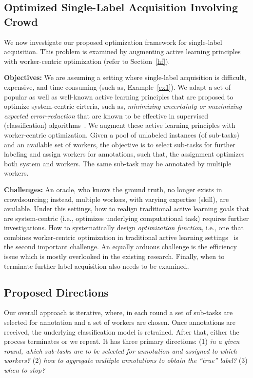 \vspace{-0.2in}
\subsection{Optimized Single-Label Acquisition Involving Crowd}\label{label}
\vspace{-0.1in}
We now investigate our proposed optimization framework for single-label acquisition. This problem is examined by augmenting active learning principles with worker-centric optimization (refer to Section~\ref{hf}).

{\bf Objectives:} We are assuming a setting where single-label acquisition is difficult, expensive, and time consuming (such as, Example~\ref{ex1}). We adapt a set of popular as well as well-known active learning principles\cite{al1,qbc1,qbc2,error-reduction} that are proposed to optimize system-centric cirteria, such as, {\em minimizing uncertainty or maximizing expected error-reduction} that are known to be effective in supervised (classification) algorithms~\cite{al-svm,al-svm2,al-dtree,korner2006multi}. We augment these active learning principles with worker-centric optimization. Given a pool of unlabeled instances  (of sub-tasks) and an available set of workers, the objective is to select sub-tasks for further labeling and assign workers for annotations, such that, the assignment optimizes both system and workers. The same sub-task may be annotated  by multiple workers.

{\bf Challenges:} An oracle, who knows the ground truth, no longer exists in crowdsourcing; instead, multiple workers, with varying expertise (skill), are available. Under this settings, how to realign traditional active learning goals that are system-centric (i.e., optimizes underlying computational task) requires further investigations. How to systematically design {\em optimization function}, i.e., one that combines worker-centric optimization in traditional active learning settings~\cite{active-learning-cs1,active-learning-cs2} is the second important challenge. An equally arduous challenge is the efficiency issue which is mostly overlooked in the existing research. Finally, when to terminate further label acquisition also needs to be examined.

\vspace{-0.1in}
\subsection{ Proposed Directions}
\vspace{-0.1in}
Our overall approach is iterative, where, in each round a set of sub-tasks are selected for annotation and a set of workers are chosen. Once annotations are received, the underlying classification model is retrained. After that, either the process terminates or we repeat. It has three primary directions: (1) {\em in a given round, which sub-tasks are to be selected for annotation and assigned to which workers?} (2) {\em  how to aggregate multiple annotations to obtain the ``true'' label?} (3) {\em when to stop?}  

